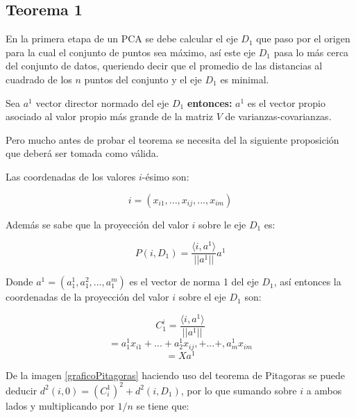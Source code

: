 \subsection{Teorema 1}

En la primera etapa de un PCA se debe calcular el eje $D_1$ que paso por el origen para la cual el conjunto de puntos sea máximo, así este eje $D_1$ pasa lo más cerca del conjunto de datos, queriendo decir que el promedio de las distancias al cuadrado de los $n$ puntos del conjunto y el eje $D_1$ es minimal.

Sea $a^1$  vector director normado del eje $D_1$ \textbf{entonces: } $a^1$ es el vector propio asociado al valor propio más grande de la matriz $V$ de varianzas-covarianzas.

Pero mucho antes de probar el teorema se necesita del la siguiente proposición que deberá ser tomada como válida.


Las coordenadas de los valores $i$-ésimo son:
 
 $$i=(x_{i1},...,x_{ij},...,x_{im})$$
 
 Además se sabe que la proyección del valor $i$ sobre le eje $D_1$ es:
 
 
 $$P(i,D_1)=\dfrac{\langle i, a^1 \rangle}{||a^1||}a^1$$
 
 Donde $a^1=(a_{1}^{1},a_{1}^{2},...,a_{1}^{m})$ es el vector de norma 1 del eje $D_1$, así entonces la coordenadas de la proyección del valor $i$ sobre el eje $D_1$ son:
 
 $$C_{1}^{i}=\dfrac{\langle i, a^1 \rangle}{||a^1||}$$
 $$=a_{1}^{1}x_{i1}+...+a_{2}^{1}x_{ij},+...+,a_{m}^{1}x_{im}$$
 $$=Xa^1$$
 

De la imagen \ref{graficoPitagoras} haciendo uso del teorema de 
Pitagoras se puede deducir $d^2(i,0)=(C_{i}^{1})^2+d^2(i,D_1)$, por lo que sumando sobre $i$ a ambos lados y multiplicando por $1/n$ se tiene que:

